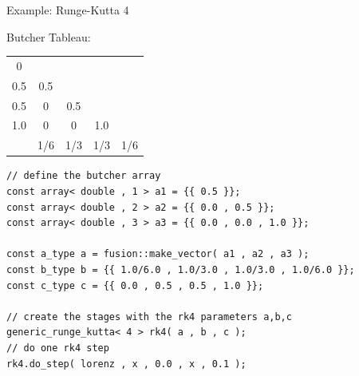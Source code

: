 \documentclass{beamer}
\begin{document}
\begin{frame}[fragile]{Example: Runge-Kutta 4}

\begin{center}
Butcher Tableau: 
 \begin{tabular}{c|cccc}
   0 &  & &  & \\
   0.5 & 0.5 & & & \\
   0.5 & 0 & 0.5 & & \\
   1.0 & 0 & 0 & 1.0 & \\
  \hline 
    & 1/6 & 1/3 & 1/3 & 1/6 \\
 \end{tabular}
\end{center}


\begin{lstlisting}[basicstyle=\ttfamily\scriptsize]
 // define the butcher array
const array< double , 1 > a1 = {{ 0.5 }};
const array< double , 2 > a2 = {{ 0.0 , 0.5 }};
const array< double , 3 > a3 = {{ 0.0 , 0.0 , 1.0 }};

const a_type a = fusion::make_vector( a1 , a2 , a3 );
const b_type b = {{ 1.0/6.0 , 1.0/3.0 , 1.0/3.0 , 1.0/6.0 }};
const c_type c = {{ 0.0 , 0.5 , 0.5 , 1.0 }};

// create the stages with the rk4 parameters a,b,c
generic_runge_kutta< 4 > rk4( a , b , c );
// do one rk4 step
rk4.do_step( lorenz , x , 0.0 , x , 0.1 ); 
\end{lstlisting}
\end{frame}
\end{document}
